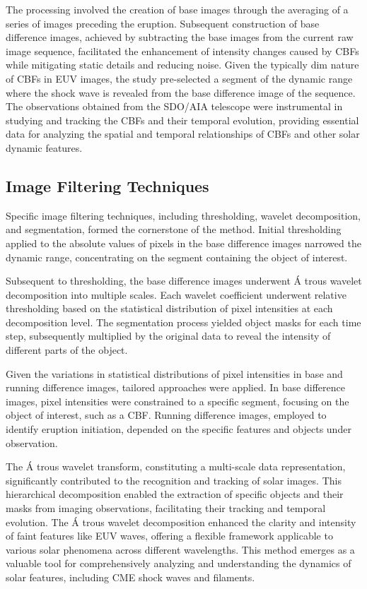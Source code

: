 The processing involved the creation of base images through the averaging of a series of images preceding the eruption. Subsequent construction of base difference images, achieved by subtracting the base images from the current raw image sequence, facilitated the enhancement of intensity changes caused by CBFs while mitigating static details and reducing noise. Given the typically dim nature of CBFs in EUV images, the study pre-selected a segment of the dynamic range where the shock wave is revealed from the base difference image of the sequence. The observations obtained from the SDO/AIA telescope were instrumental in studying and tracking the CBFs and their temporal evolution, providing essential data for analyzing the spatial and temporal relationships of CBFs and other solar dynamic features.

\subsection{Image Filtering Techniques}
Specific image filtering techniques, including thresholding, wavelet decomposition, and segmentation, formed the cornerstone of the method. Initial thresholding applied to the absolute values of pixels in the base difference images narrowed the dynamic range, concentrating on the segment containing the object of interest.

Subsequent to thresholding, the base difference images underwent \'A trous wavelet decomposition into multiple scales. Each wavelet coefficient underwent relative thresholding based on the statistical distribution of pixel intensities at each decomposition level. The segmentation process yielded object masks for each time step, subsequently multiplied by the original data to reveal the intensity of different parts of the object.

Given the variations in statistical distributions of pixel intensities in base and running difference images, tailored approaches were applied. In base difference images, pixel intensities were constrained to a specific segment, focusing on the object of interest, such as a CBF. Running difference images, employed to identify eruption initiation, depended on the specific features and objects under observation.

The \'A trous wavelet transform, constituting a multi-scale data representation, significantly contributed to the recognition and tracking of solar images. This hierarchical decomposition enabled the extraction of specific objects and their masks from imaging observations, facilitating their tracking and temporal evolution. The \'A trous wavelet decomposition enhanced the clarity and intensity of faint features like EUV waves, offering a flexible framework applicable to various solar phenomena across different wavelengths. This method emerges as a valuable tool for comprehensively analyzing and understanding the dynamics of solar features, including CME shock waves and filaments.

